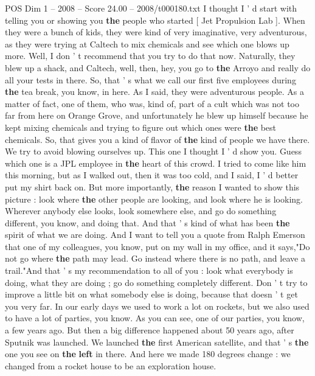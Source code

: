 \begin{textsample}{POS Dim 1 – 2008 – Score 24.00 – 2008/t000180.txt}  \label{ex:f1_pos_008}
I thought I ' d start with telling you or showing you \textbf{the} people who started [ Jet Propulsion Lab ].
When they were a bunch of kids, they were kind of very imaginative, very adventurous, as they were trying at Caltech to mix chemicals and see which one blows up more.
Well, I don ' t recommend that you try to do that now.
Naturally, they blew up a shack, and Caltech, well, then, hey, you go to \textbf{the} Arroyo and really do all your tests in there.
So, that ' s what we call our first five employees during \textbf{the} tea break, you know, in here.
As I said, they were adventurous people.
As a matter of fact, one of them, who was, kind of, part of a cult which was not too far from here on Orange Grove, and unfortunately he blew up himself because he kept mixing chemicals and trying to figure out which ones were \textbf{the} best chemicals.
So, that gives you a kind of flavor of \textbf{the} kind of people we have there.
We try to avoid blowing ourselves up.
This one I thought I ' d show you.
Guess which one is a JPL employee in \textbf{the} heart of this crowd.
I tried to come like him this morning, but as I walked out, then it was too cold, and I said, I ' d better put my shirt back on.
But more importantly, \textbf{the} reason I wanted to show this picture : look where \textbf{the} other people are looking, and look where he is looking.
Wherever anybody else looks, look somewhere else, and go do something different, you know, and doing that.
And that ' s kind of what has been \textbf{the} spirit of what we are doing.
And I want to tell you a quote from Ralph Emerson that one of my colleagues, you know, put on my wall in my office, and it says,"Do not go where \textbf{the} path may lead.
Go instead where there is no path, and leave a trail."And that ' s my recommendation to all of you : look what everybody is doing, what they are doing ; go do something completely different.
Don ' t try to improve a little bit on what somebody else is doing, because that doesn ' t get you very far.
In our early days we used to work a lot on rockets, but we also used to have a lot of parties, you know.
As you can see, one of our parties, you know, a few years ago.
But then a big difference happened about 50 years ago, after Sputnik was launched.
We launched \textbf{the} first American satellite, and that ' s \textbf{the} one you see on \textbf{the} \textbf{left} in there.
And here we made 180 degrees change : we changed from a rocket house to be an exploration house.

\end{textsample}
